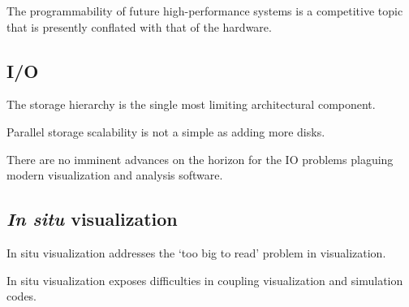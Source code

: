 The programmability of future high-performance systems is a competitive
topic that is presently conflated with that of the hardware.


\subsection{I/O}

The storage hierarchy is the single most limiting architectural
component.

Parallel storage scalability is not a simple as adding more disks.


There are no imminent advances on the horizon for the IO problems
plaguing modern visualization and analysis software.

\subsection{\textit{In situ} visualization}

In situ visualization addresses the `too big to read' problem in
visualization.

In situ visualization exposes difficulties in coupling visualization
and simulation codes.


